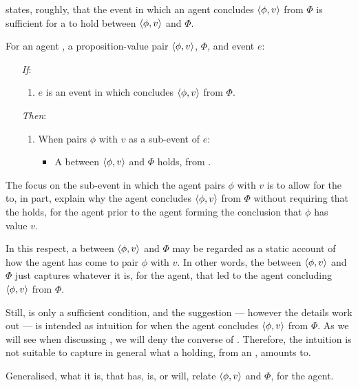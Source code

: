 \begin{note}
  \supportI{} states, roughly, that the event in which an agent concludes \(\langle \phi, v \rangle\) from \(\Phi\) is sufficient for a \ros{} to hold between \(\langle \phi, v \rangle\) and \(\Phi\).

  \begin{idea}[\supportI{}]
    \label{idea:support}
    For an agent \vAgent{}, a proposition-value pair \(\langle \phi, v \rangle\), \pool{} \(\Phi\), and event \(e\):

    \begin{itemize}
    \item[\emph{If}:]
      \begin{enumerate}[label=\alph*., ref=(\alph*)]
      \item
        \(e\) is an event in which \vAgent{} concludes \(\langle \phi, v \rangle\) from \(\Phi\).
      \end{enumerate}
    \item[\emph{Then}:]
      \begin{enumerate}[label=\alph*., ref=(\alph*), resume]
      \item
        When \vAgent{} pairs \(\phi\) with \(v\) as a sub-event of \(e\):
        \begin{itemize}
        \item
          A \emph{\ros{}} between \(\langle \phi, v \rangle\) and \(\Phi\) holds, from .
        \end{itemize}
      \end{enumerate}
    \end{itemize}
    \vspace{-\baselineskip}
  \end{idea}

  The focus on the sub-event in which the agent pairs \(\phi\) with \(v\) is to allow for the \ros{} to, in part, explain why the agent concludes \(\langle \phi, v \rangle\) from \(\Phi\) without requiring that the \ros{} holds, for the agent prior to the agent forming the conclusion that \(\phi\) has value \(v\).

  In this respect, a \ros{} between \(\langle \phi, v \rangle\) and \(\Phi\) may be regarded as a static account of how the agent has come to pair \(\phi\) with \(v\).
  In other words, the \ros{} between \(\langle \phi, v \rangle\) and \(\Phi\) just captures whatever it is, for the agent, that led to the agent concluding \(\langle \phi, v \rangle\) from \(\Phi\).

  Still, \supportI{} is only a sufficient condition, and the suggestion --- however the details work out --- is intended as intuition for when the agent concludes \(\langle \phi, v \rangle\) from \(\Phi\).
  As we will see when discussing \supportII{}, we will deny the converse of \supportI{}.
  Therefore, the intuition is not suitable to capture in general what a \ros{} holding, from an \agpe{}, amounts to.

  Generalised, what it is, that has, is, or will, relate \(\langle \phi, v \rangle\) and \(\Phi\), for the agent.
\end{note}

